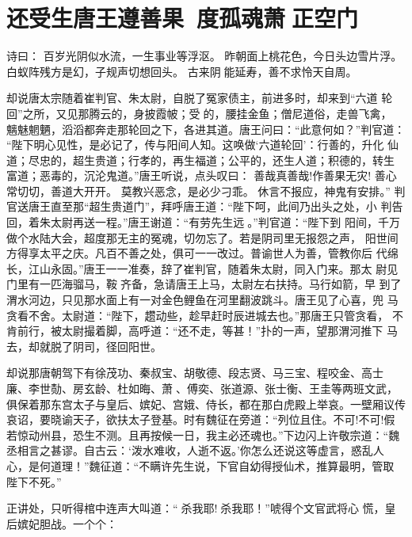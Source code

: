 \chapter{还受生唐王遵善果~度孤魂萧正空门}

诗曰：
百岁光阴似水流，一生事业等浮沤。
昨朝面上桃花色，今日头边雪片浮。
白蚁阵残方是幻，子规声切想回头。
古来阴能延寿，善不求怜天自周。

却说唐太宗随着崔判官、朱太尉，自脱了冤家债主，前进多时，却来到“六道
轮回”之所，又见那腾云的，身披霞帔；受的，腰挂金鱼；僧尼道俗，走兽飞禽，
魑魅魍魉，滔滔都奔走那轮回之下，各进其道。唐王问曰：“此意何如？”判官道：
“陛下明心见性，是必记了，传与阳间人知。这唤做‘六道轮回’：行善的，升化
仙道；尽忠的，超生贵道；行孝的，再生福道；公平的，还生人道；积德的，转生
富道；恶毒的，沉沦鬼道。”唐王听说，点头叹曰：
善哉真善哉!作善果无灾!
善心常切切，善道大开开。
莫教兴恶念，是必少刁乖。
休言不报应，神鬼有安排。”
判官送唐王直至那“超生贵道门”，拜呼唐王道：“陛下呵，此间乃出头之处，小
判告回，着朱太尉再送一程。”唐王谢道：“有劳先生远。”判官道：“陛下到
阳间，千万做个水陆大会，超度那无主的冤魂，切勿忘了。若是阴司里无报怨之声，
阳世间方得享太平之庆。凡百不善之处，俱可一一改过。普谕世人为善，管教你后
代绵长，江山永固。”唐王一一准奏，辞了崔判官，随着朱太尉，同入门来。那太
尉见门里有一匹海骝马，鞍齐备，急请唐王上马，太尉左右扶持。马行如箭，早
到了渭水河边，只见那水面上有一对金色鲤鱼在河里翻波跳斗。唐王见了心喜，兜
马贪看不舍。太尉道：“陛下，趱动些，趁早赶时辰进城去也。”那唐王只管贪看，
不肯前行，被太尉撮着脚，高呼道：“还不走，等甚！”扑的一声，望那渭河推下
马去，却就脱了阴司，径回阳世。

却说那唐朝驾下有徐茂功、秦叔宝、胡敬德、段志贤、马三宝、程咬金、高士
廉、李世𪟝、房玄龄、杜如晦、萧、傅奕、张道源、张士衡、王圭等两班文武，
俱保着那东宫太子与皇后、嫔妃、宫娥、侍长，都在那白虎殿上举哀。一壁厢议传
哀诏，要晓谕天子，欲扶太子登基。时有魏征在旁道：“列位且住。不可!不可!假
若惊动州县，恐生不测。且再按候一日，我主必还魂也。”下边闪上许敬宗道：“魏
丞相言之甚谬。自古云：‘泼水难收，人逝不返。’你怎么还说这等虚言，惑乱人
心，是何道理！”魏征道：“不瞒许先生说，下官自幼得授仙术，推算最明，管取
陛下不死。”

正讲处，只听得棺中连声大叫道：“杀我耶!杀我耶！”唬得个文官武将心
慌，皇后嫔妃胆战。一个个：

